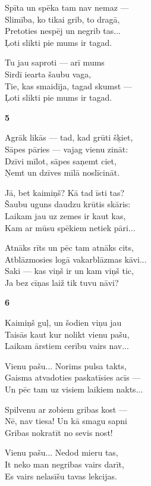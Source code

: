 \documentclass[14pt]{extarticle}
\begin{document}
{{Spīta un spēka tam nav nemaz ---\\
Slimība, ko tikai grib, to dragā,\\
Pretoties nespēj un negrib tas...\\
Ļoti slikti pie mums ir tagad. 

Tu jau saproti --- arī mums\\
Sirdī iearta šaubu vaga,\\
Tie, kas smaidīja, tagad skumst ---\\
Ļoti slikti pie mums ir tagad. 


\newpage 

{\bf 5}

Agrāk likās --- tad, kad grūti šķiet,\\
Sāpes pāries --- vajag vienu zināt:\\
Dzīvi mīlot, sāpes saņemt ciet,\\
Ņemt un dzīves mīlā noslīcināt. 

Jā, bet kaimiņš? Kā tad īsti tas?\\
Šaubu uguns daudzu krūtis skāris:\\
Laikam jau uz zemes ir kaut kas,\\
Kam ar mūsu spēkiem netiek pāri...

Atnāks rīts un pēc tam atnāks cits,\\
Atblāzmosies logā vakarblāzmas kāvi...\\
Saki --- kas viņš ir un kam viņš tic,\\
Ja bez cīņas laiž tik tuvu nāvi?

\newpage

{\bf 6}

Kaimiņš guļ, un šodien viņu jau\\
Taisās kaut kur nolikt vienu pašu,\\
Laikam ārstiem cerību vairs nav...

Vienu pašu... Norims pulsa takts,\\
Gaisma atvadoties paskatīsies acīs ---\\
Un pēc tam uz visiem laikiem nakts...

Spilvenu ar zobiem gribas kost ---\\
Nē, nav tiesa! Un kā smagu sapni\\
Gribas nokratīt no sevis nost!

Vienu pašu... Nedod mieru tas,\\
It neko man negribas vairs darīt,\\
Es vairs nelasīšu tavas lekcijas. 

}}
\end{document}
